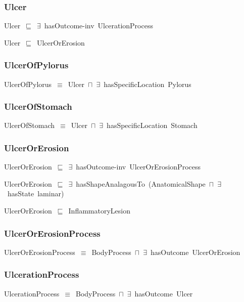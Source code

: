 \documentclass{article}
\begin{document}
\subsubsection*{Ulcer}

Ulcer~\ensuremath{\sqsubseteq}~\ensuremath{\exists}~hasOutcome-inv~UlcerationProcess~

Ulcer~\ensuremath{\sqsubseteq}~UlcerOrErosion~

\subsubsection*{UlcerOfPylorus}

UlcerOfPylorus~\ensuremath{\equiv}~Ulcer~\ensuremath{\sqcap}~\ensuremath{\exists}~hasSpecificLocation~Pylorus

\subsubsection*{UlcerOfStomach}

UlcerOfStomach~\ensuremath{\equiv}~Ulcer~\ensuremath{\sqcap}~\ensuremath{\exists}~hasSpecificLocation~Stomach

\subsubsection*{UlcerOrErosion}

UlcerOrErosion~\ensuremath{\sqsubseteq}~\ensuremath{\exists}~hasOutcome-inv~UlcerOrErosionProcess~

UlcerOrErosion~\ensuremath{\sqsubseteq}~\ensuremath{\exists}~hasShapeAnalagousTo~(AnatomicalShape~\ensuremath{\sqcap}~\ensuremath{\exists}~hasState~laminar)~

UlcerOrErosion~\ensuremath{\sqsubseteq}~InflammatoryLesion~

\subsubsection*{UlcerOrErosionProcess}

UlcerOrErosionProcess~\ensuremath{\equiv}~BodyProcess~\ensuremath{\sqcap}~\ensuremath{\exists}~hasOutcome~UlcerOrErosion

\subsubsection*{UlcerationProcess}

UlcerationProcess~\ensuremath{\equiv}~BodyProcess~\ensuremath{\sqcap}~\ensuremath{\exists}~hasOutcome~Ulcer
\end{document}
